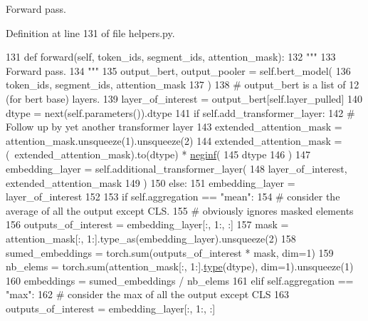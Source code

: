 \begin{DoxyVerb}Forward pass.
\end{DoxyVerb}
 

Definition at line 131 of file helpers.\+py.


\begin{DoxyCode}
131     \textcolor{keyword}{def }forward(self, token\_ids, segment\_ids, attention\_mask):
132         \textcolor{stringliteral}{"""}
133 \textcolor{stringliteral}{        Forward pass.}
134 \textcolor{stringliteral}{        """}
135         output\_bert, output\_pooler = self.bert\_model(
136             token\_ids, segment\_ids, attention\_mask
137         )
138         \textcolor{comment}{# output\_bert is a list of 12 (for bert base) layers.}
139         layer\_of\_interest = output\_bert[self.layer\_pulled]
140         dtype = next(self.parameters()).dtype
141         \textcolor{keywordflow}{if} self.add\_transformer\_layer:
142             \textcolor{comment}{# Follow up by yet another transformer layer}
143             extended\_attention\_mask = attention\_mask.unsqueeze(1).unsqueeze(2)
144             extended\_attention\_mask = (~extended\_attention\_mask).to(dtype) * 
      \hyperlink{namespaceparlai_1_1utils_1_1torch_a6c6e25115353dba479cd72dc31dc76ae}{neginf}(
145                 dtype
146             )
147             embedding\_layer = self.additional\_transformer\_layer(
148                 layer\_of\_interest, extended\_attention\_mask
149             )
150         \textcolor{keywordflow}{else}:
151             embedding\_layer = layer\_of\_interest
152 
153         \textcolor{keywordflow}{if} self.aggregation == \textcolor{stringliteral}{"mean"}:
154             \textcolor{comment}{#  consider the average of all the output except CLS.}
155             \textcolor{comment}{# obviously ignores masked elements}
156             outputs\_of\_interest = embedding\_layer[:, 1:, :]
157             mask = attention\_mask[:, 1:].type\_as(embedding\_layer).unsqueeze(2)
158             sumed\_embeddings = torch.sum(outputs\_of\_interest * mask, dim=1)
159             nb\_elems = torch.sum(attention\_mask[:, 1:].\hyperlink{namespaceparlai_1_1agents_1_1tfidf__retriever_1_1build__tfidf_ad5dfae268e23f506da084a9efb72f619}{type}(dtype), dim=1).unsqueeze(1)
160             embeddings = sumed\_embeddings / nb\_elems
161         \textcolor{keywordflow}{elif} self.aggregation == \textcolor{stringliteral}{"max"}:
162             \textcolor{comment}{#  consider the max of all the output except CLS}
163             outputs\_of\_interest = embedding\_layer[:, 1:, :]

\end{DoxyCode}
